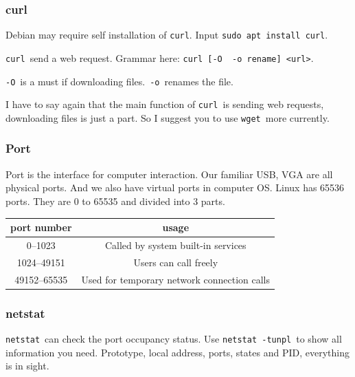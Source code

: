 \documentclass[12pt]{ctexart}
\newenvironment{mdquote}
{%
  \par\noindent
  \begin{list}{}{%
      \setlength{\leftmargin}{1em}%
      \setlength{\rightmargin}{0pt}%
      \setlength{\itemindent}{0pt}%
      \setlength{\listparindent}{\parindent}%
      \setlength{\topsep}{0.5\baselineskip}%
  }
  \item[\textbf{>}\ ]\itshape
}
{\end{list}\par}
\begin{document}
\subsubsection{\textbf{curl}}

\begin{mdquote}
Debian may require self installation of \texttt{curl}. Input
\texttt{sudo\ apt\ install\ curl}.
\end{mdquote}

\texttt{curl}\ send a web request. Grammar here:
\texttt{curl\ {[}-O\ \textbar{}\ -o\ rename{]}\ \textless{}url\textgreater{}}.

\texttt{-O}\ is a must if downloading files.\ \texttt{-o}\ renames the
file.

I have to say again that the main function of \texttt{curl}\ is sending
web requests, downloading files is just a part. So I suggest you to use
\texttt{wget}\ more currently.

\subsubsection{\textbf{Port}}

Port is the interface for computer interaction. Our familiar USB, VGA
are all physical ports. And we also have virtual ports in computer OS.
Linux has 65536 ports. They are 0 to 65535 and divided into 3 parts.

\begin{table}[H]
    \centering
    \begin{tabular}{cc}
    \toprule
    port number & usage \\
    \midrule
    0--1023 & Called by system built-in services \\
    1024--49151 & Users can call freely \\
    49152--65535 & Used for temporary network connection calls \\
    \bottomrule
    \end{tabular}
\end{table}

\subsubsection*{\textbf{netstat}}

\texttt{netstat}\ can check the port occupancy status. Use
\texttt{netstat\ -tunpl}\ to show all information you need. Prototype,
local address, ports, states and PID, everything is in sight.
\end{document}
